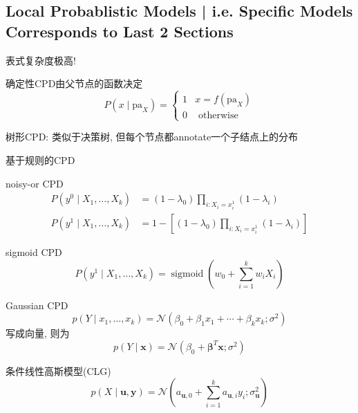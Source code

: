 \documentclass{article}
\begin{document}
\subsection{Local Probablistic Models | i.e. Specific Models Corresponds to Last 2 Sections}
\begin{flushleft}
    表式\trarr 复杂度极高!

    确定性CPD由父节点的函数决定
    \begin{equation}
        P\left(x \mid \mathrm{pa}_{X}\right)=\left\{\begin{array}{ll}
        1 & x=f\left(\mathrm{pa}_{X}\right) \\
        0 & \text { otherwise }
        \end{array}\right.
    \end{equation}

    树形CPD: 类似于决策树, 但每个节点都annotate一个子结点上的分布

    基于规则的CPD

    noisy-or CPD 
    \begin{equation}
        \begin{aligned}
        P\left(y^{0} \mid X_{1}, \ldots, X_{k}\right) &=\left(1-\lambda_{0}\right) \prod_{i: X_{i}=x_{i}^{1}}\left(1-\lambda_{i}\right) \\
        P\left(y^{1} \mid X_{1}, \ldots, X_{k}\right) &=1-\left[\left(1-\lambda_{0}\right) \prod_{i: X_{i}=x_{i}^{1}}\left(1-\lambda_{i}\right)\right]
        \end{aligned}
    \end{equation}

    sigmoid CPD
    \begin{equation}
        P\left(y^{1} \mid X_{1}, \ldots, X_{k}\right)=\operatorname{sigmoid}\left(w_{0}+\sum_{i=1}^{k} w_{i} X_{i}\right)
    \end{equation}

    Gaussian CPD 
    \begin{equation}
        p\left(Y \mid x_{1}, \ldots, x_{k}\right)=\mathcal{N}\left(\beta_{0}+\beta_{1} x_{1}+\cdots+\beta_{k} x_{k} ; \sigma^{2}\right)
    \end{equation}
    写成向量, 则为
    \begin{equation}
        p(Y \mid \boldsymbol{x})=\mathcal{N}\left(\beta_{0}+\boldsymbol{\beta}^{T} \boldsymbol{x} ; \sigma^{2}\right)
    \end{equation}

    条件线性高斯模型(CLG)
    \begin{equation}
        p(X \mid \boldsymbol{u}, \boldsymbol{y})=\mathcal{N}\left(a_{\boldsymbol{u}, 0}+\sum_{i=1}^{k} a_{\boldsymbol{u}, i} y_{i} ; \sigma_{\boldsymbol{u}}^{2}\right)
    \end{equation}


\end{flushleft}
\end{document}
